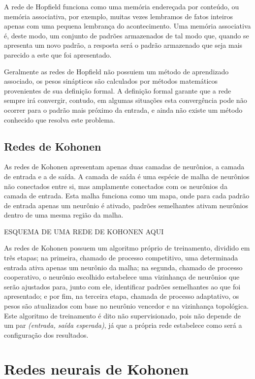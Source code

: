 A rede de Hopfield funciona como uma memória endereçada por conteúdo, ou memória
associativa, por exemplo, muitas vezes lembramos de fatos inteiros apenas com uma
pequena lembrança do acontecimento. Uma memória associativa é, deste modo, um
conjunto de padrões armazenados de tal modo que, quando se apresenta um novo padrão,
a resposta será o padrão armazenado que seja mais parecido a este que foi apresentado.

Geralmente as redes de Hopfield não possuiem um método de aprendizado associado,
os pesos sinápticos são calculados por métodos matemáticos provenientes de sua
definição formal. A definição formal garante que a rede sempre irá convergir,
contudo, em algumas situações esta convergência pode não ocorrer para o padrão
mais próximo da entrada, e ainda não existe um método conhecido que resolva
este problema.

\subsection{Redes de Kohonen}

As redes de Kohonen apresentam apenas duas camadas de neurônios, a camada de
entrada e a de saída. A camada de saída é uma espécie de malha de neurônios não
conectados entre si, mas amplamente conectados com os neurônios da camada de
entrada. Esta malha funciona como um mapa, onde para cada padrão de entrada
apenas um neurônio é ativado, padrões semelhantes ativam neurônios dentro de
uma mesma região da malha.

ESQUEMA DE UMA REDE DE KOHONEN AQUI

As redes de Kohonen possuem um algoritmo próprio de treinamento, dividido em
três etapas; na primeira, chamado de processo competitivo, uma determinada entrada
ativa apenas um neurônio da malha; na segunda, chamado de processo cooperativo,
o neurônio escolhido estabelece uma vizinhança de neurônios que serão ajustados
para, junto com ele, identificar padrões semelhantes ao que foi apresentado; e
por fim, na terceira etapa, chamada de processo adaptativo, os pesos são
atualizados com base no neurônio vencedor e na vizinhança topológica. Este
algoritmo de treinamento é dito não supervisionado, pois não depende de um
par \textit{(entrada, saída esperada)}, já que a própria rede estabelece como
será a configuração dos resultados.

\section{Redes neurais de Kohonen}\label{sec:red_khn}

